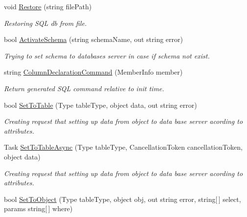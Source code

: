 \begin{DoxyCompactItemize}
void \mbox{\hyperlink{interface_uniform_data_operator_1_1_sql_1_1_i_sql_operator_acf6fdbfc57a21efc371e0772244defd5}{Restore}} (string file\+Path)
\begin{DoxyCompactList}\small\item\em Restoring S\+QL db from file. \end{DoxyCompactList}\item 
bool \mbox{\hyperlink{interface_uniform_data_operator_1_1_sql_1_1_i_sql_operator_a5ae8328a464ef80f1ae1bd46a573c265}{Activate\+Schema}} (string schema\+Name, out string error)
\begin{DoxyCompactList}\small\item\em Trying to set schema to databases server in case if schema not exist. \end{DoxyCompactList}\item 
string \mbox{\hyperlink{interface_uniform_data_operator_1_1_sql_1_1_i_sql_operator_aac9c3ed1e73af66e383340a154786ec7}{Column\+Declaration\+Command}} (Member\+Info member)
\begin{DoxyCompactList}\small\item\em Return generated S\+QL command relative to init time. \end{DoxyCompactList}\item 
bool \mbox{\hyperlink{interface_uniform_data_operator_1_1_sql_1_1_i_sql_operator_ad05106eb6bd1a50f35b476a42821dfa3}{Set\+To\+Table}} (Type table\+Type, object data, out string error)
\begin{DoxyCompactList}\small\item\em Creating request that setting up data from object to data base server acording to attributes. \end{DoxyCompactList}\item 
Task \mbox{\hyperlink{interface_uniform_data_operator_1_1_sql_1_1_i_sql_operator_a35ef3899954f213e391751e9cda09322}{Set\+To\+Table\+Async}} (Type table\+Type, Cancellation\+Token cancellation\+Token, object data)
\begin{DoxyCompactList}\small\item\em Creating request that setting up data from object to data base server acording to attributes. \end{DoxyCompactList}\item 
bool \mbox{\hyperlink{interface_uniform_data_operator_1_1_sql_1_1_i_sql_operator_a9a1822fcafcb1a3abd59b40f2cef7930}{Set\+To\+Object}} (Type table\+Type, object obj, out string error, string\mbox{[}$\,$\mbox{]} select, params string\mbox{[}$\,$\mbox{]} where)

\end{DoxyCompactItemize}
